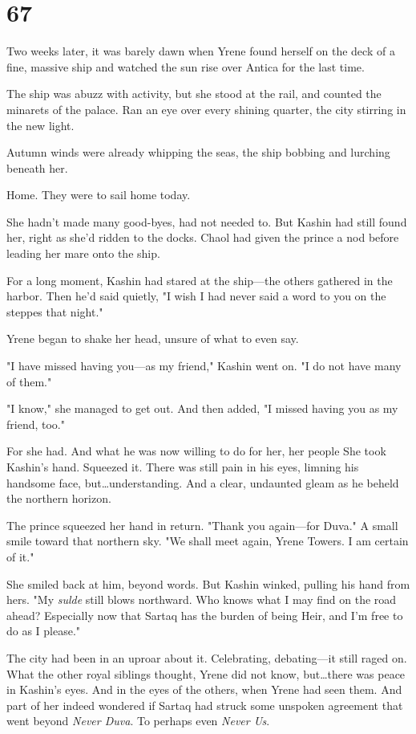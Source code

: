 
\chapter{67}

Two weeks later, it was barely dawn when Yrene found herself on the deck of a fine, massive ship and watched the sun rise over Antica for the last time.

The ship was abuzz with activity, but she stood at the rail, and counted the minarets of the palace.
Ran an eye over every shining quarter, the city stirring in the new light.

Autumn winds were already whipping the seas, the ship bobbing and lurching beneath her.

Home.
They were to sail home today.

She hadn't made many good-byes, had not needed to.
But Kashin had still found her, right as she'd ridden to the docks.
Chaol had given the prince a nod before leading her mare onto the ship.

For a long moment, Kashin had stared at the ship---the others gathered in the harbor.
Then he'd said quietly, "I wish I had never said a word to you on the steppes that night."

Yrene began to shake her head, unsure of what to even say.

"I have missed having you---as my friend," Kashin went on.
"I do not have many of them."

"I know," she managed to get out.
And then added, "I missed having you as my friend, too."

For she had.
And what he was now willing to do for her, her people 
She took Kashin's hand.
Squeezed it.
There was still pain in his eyes, limning his handsome face, but\ldots understanding.
And a clear, undaunted gleam as he beheld the northern horizon.

The prince squeezed her hand in return.
"Thank you again---for Duva."
A small smile toward that northern sky.
"We shall meet again, Yrene Towers.
I am certain of it."

She smiled back at him, beyond words.
But Kashin winked, pulling his hand from hers.
"My \emph{sulde} still blows northward.
Who knows what I may find on the road ahead?
Especially now that Sartaq has the burden of being Heir, and I'm free to do as I please."

The city had been in an uproar about it.
Celebrating, debating---it still raged on.
What the other royal siblings thought, Yrene did not know, but\ldots there was peace in Kashin's eyes.
And in the eyes of the others, when Yrene had seen them.
And part of her indeed wondered if Sartaq had struck some unspoken agreement that went beyond \emph{Never Duva}.
To perhaps even \emph{Never Us}.

